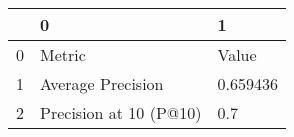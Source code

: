 \begin{tabular}{lll}
\toprule
{} &                       0 &         1 \\
\midrule
0 &                  Metric &     Value \\
1 &       Average Precision &  0.659436 \\
2 &  Precision at 10 (P@10) &       0.7 \\
\bottomrule
\end{tabular}
